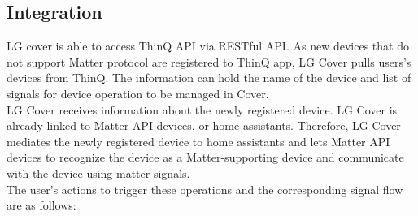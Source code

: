\documentclass[conference]{IEEEtran}
\begin{document}
\subsection{\large{Integration}}
LG cover is able to access ThinQ API via RESTful API. As new devices that do not support Matter protocol are registered to ThinQ app, LG Cover pulls users’s devices from ThinQ. The information can hold the name of the device and list of signals for device operation to be managed in Cover.\\
LG Cover receives information about the newly registered device. LG Cover is already linked to Matter API devices, or home assistants. Therefore, LG Cover mediates the newly registered device to home assistants and lets Matter API devices to recognize the device as a Matter-supporting device and communicate with the device using matter signals.\\
The user's actions to trigger these operations and the corresponding signal flow are as follows:\\
\end{document}
